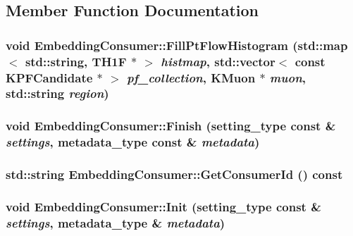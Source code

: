 \subsection{Member Function Documentation}
\hypertarget{classEmbeddingConsumer_adeac700fdc0f9fc8bc3c19c5a2220158}{
\subsubsection[{FillPtFlowHistogram}]{\setlength{\rightskip}{0pt plus 5cm}void EmbeddingConsumer::FillPtFlowHistogram (std::map$<$ std::string, TH1F $\ast$ $>$ {\em histmap}, \/  std::vector$<$ const KPFCandidate $\ast$ $>$ {\em pf\_\-collection}, \/  KMuon $\ast$ {\em muon}, \/  std::string {\em region})}}
\label{classEmbeddingConsumer_adeac700fdc0f9fc8bc3c19c5a2220158}
\hypertarget{classEmbeddingConsumer_aab5d24f15ec4efe3186d72a1fa0b1fa7}{
\subsubsection[{Finish}]{\setlength{\rightskip}{0pt plus 5cm}void EmbeddingConsumer::Finish (setting\_\-type const \& {\em settings}, \/  metadata\_\-type const \& {\em metadata})}}
\label{classEmbeddingConsumer_aab5d24f15ec4efe3186d72a1fa0b1fa7}
\hypertarget{classEmbeddingConsumer_aeac6c210fd46bd9bb1f56c496ca0ff50}{
\subsubsection[{GetConsumerId}]{\setlength{\rightskip}{0pt plus 5cm}std::string EmbeddingConsumer::GetConsumerId () const}}
\label{classEmbeddingConsumer_aeac6c210fd46bd9bb1f56c496ca0ff50}
\hypertarget{classEmbeddingConsumer_a47494820d0e08242f08c6b8afa7c347f}{
\subsubsection[{Init}]{\setlength{\rightskip}{0pt plus 5cm}void EmbeddingConsumer::Init (setting\_\-type const \& {\em settings}, \/  metadata\_\-type \& {\em metadata})}}
